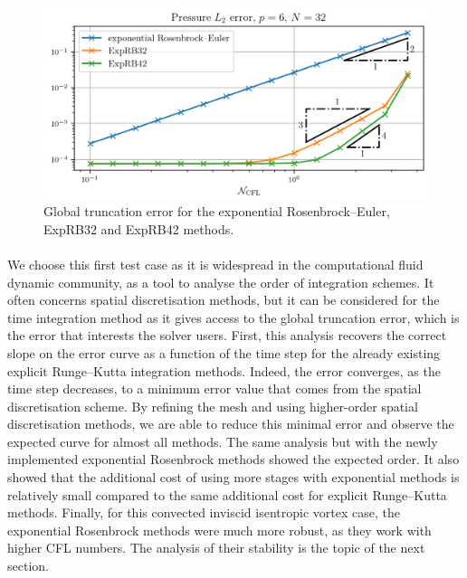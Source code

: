       \begin{figure}
        \centering
        \includegraphics{figures/covo_exp.png}
        \caption{Global truncation error for the exponential Rosenbrock--Euler, ExpRB32 and ExpRB42 methods.}
        \label{fig:covo_exp}
      \end{figure}

      \paragraph{}
      We choose this first test case as it is widespread in the computational fluid dynamic community, as a tool to analyse the order of integration schemes.
      It often concerns spatial discretisation methods, but it can be considered for the time integration method as it gives access to the global truncation error, which is the error that interests the solver users.
      First, this analysis recovers the correct slope on the error curve as a function of the time step for the already existing explicit Runge--Kutta integration methods.
      Indeed, the error converges, as the time step decreases, to a minimum error value that comes from the spatial discretisation scheme.
      By refining the mesh and using higher-order spatial discretisation methods, we are able to reduce this minimal error and observe the expected curve for almost all methods.
      The same analysis but with the newly implemented exponential Rosenbrock methods showed the expected order.
      It also showed that the additional cost of using more stages with exponential methods is relatively small compared to the same additional cost for explicit Runge--Kutta methods.
      Finally, for this convected inviscid isentropic vortex case, the exponential Rosenbrock methods were much more robust, as they work with higher CFL numbers.
      The analysis of their stability is the topic of the next section.


